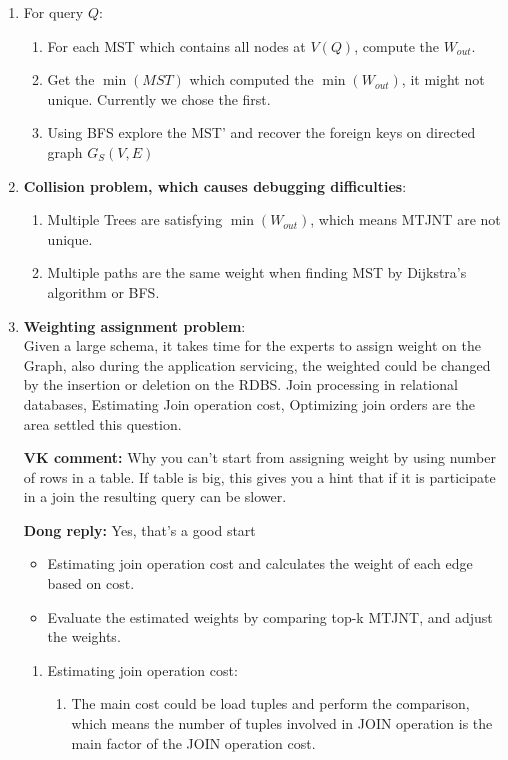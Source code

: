 \begin{enumerate}
\begin{enumerate}
  \item For query $Q$:
    \begin{enumerate}
    \item For each MST which contains all nodes at $V(Q)$, compute the $W_{out}$.
    \item Get the $\min(MST)$ which computed the $\min(W_{out})$, it might not unique. Currently we chose the first.
    \item Using BFS explore the MST' and recover the foreign keys on directed graph $G_S(V,E)$
  \end{enumerate}
\item {\bf Collision problem, which causes debugging difficulties}:
  \begin{enumerate} 
  \item Multiple Trees are satisfying $\min(W_{out})$, which means MTJNT are not unique.
  \item Multiple paths are the same weight when finding MST by Dijkstra's algorithm or BFS.
  \end{enumerate}
\item {\bf Weighting assignment problem}: \\
Given a large schema, it takes time for the experts to assign weight on the Graph, also during the application servicing, the weighted could be changed by the insertion or deletion on the RDBS. Join processing in relational databases, Estimating Join operation cost, Optimizing join orders are the area settled this question. 

{\bf VK comment:} Why you can't start from assigning weight by using number of rows in a table.
If table is big, this gives you a hint that if it is participate in a join the resulting query
can be slower.

\setlength{\parindent}{0.5in}
{\bf Dong reply:}
Yes, that's a good start
\setlength{\parindent}{0.25in}

  \begin{itemize}
  \item Estimating join operation cost and calculates the weight of each edge based on cost.
  \item Evaluate the estimated weights by comparing top-k MTJNT, and adjust the weights.
  \end{itemize}
  \begin{enumerate}
  \item Estimating join operation cost: 
    \begin{enumerate}
    \item The main cost could be load tuples and perform the comparison, which means the number of tuples involved in JOIN operation is the main factor of the JOIN operation cost.\\


\end{enumerate}
\end{enumerate}
\end{enumerate}
\end{enumerate}
